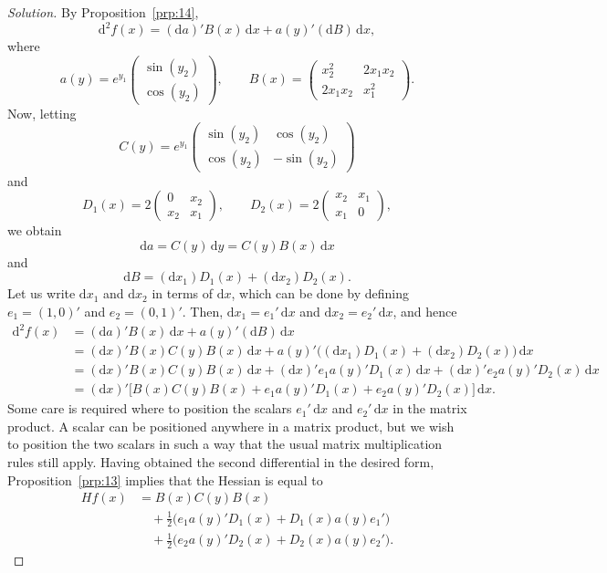 \documentclass[14pt]{extarticle}
\theoremstyle{plain}
\theoremstyle{definition}
\theoremstyle{remark}
\newenvironment{solution}{%
  \begin{proof}[Solution]%
}{%
  \end{proof}%
}
\newcommand{\dd}{\mathrm{d}}
\begin{document}
\begin{solution}
By Proposition~\ref{prp:14},
\[
\dd^2 f(x) = (\dd a)' B(x)\, \dd x + a(y)'(\dd B)\, \dd x,
\]
where
\[
a(y) = e^{y_1} \begin{pmatrix} \sin(y_2) \\ \cos(y_2) \end{pmatrix}, \qquad
B(x) = \begin{pmatrix} x_2^2 & 2x_1 x_2 \\ 2x_1 x_2 & x_1^2 \end{pmatrix}.
\]
Now, letting
\[
C(y) = e^{y_1} \begin{pmatrix} \sin(y_2) & \cos(y_2) \\ \cos(y_2) & -\sin(y_2) \end{pmatrix}
\]
and
\[
D_1(x) = 2\begin{pmatrix} 0 & x_2 \\ x_2 & x_1 \end{pmatrix}, \qquad
D_2(x) = 2\begin{pmatrix} x_2 & x_1 \\ x_1 & 0 \end{pmatrix},
\]
we obtain
\[
\dd a = C(y)\, \dd y = C(y) B(x)\, \dd x
\]
and
\[
\dd B = (\dd x_1) D_1(x) + (\dd x_2) D_2(x).
\]
Let us write $\dd x_1$ and $\dd x_2$ in terms of $\dd x$, which can be done by defining $e_1 = (1, 0)'$ and $e_2 = (0, 1)'$. Then, $\dd x_1 = e_1'\, \dd x$ and $\dd x_2 = e_2'\, \dd x$, and hence
\begin{align*}
\dd^2 f(x) &= (\dd a)' B(x)\, \dd x + a(y)'(\dd B)\, \dd x \\
&= (\dd x)' B(x) C(y) B(x)\, \dd x + a(y)'\bigl((\dd x_1) D_1(x) + (\dd x_2) D_2(x)\bigr)\, \dd x \\
&= (\dd x)' B(x) C(y) B(x)\, \dd x + (\dd x)' e_1 a(y)' D_1(x)\, \dd x + (\dd x)' e_2 a(y)' D_2(x)\, \dd x \\
&= (\dd x)'\bigl[B(x) C(y) B(x) + e_1 a(y)' D_1(x) + e_2 a(y)' D_2(x)\bigr]\, \dd x.
\end{align*}
Some care is required where to position the scalars $e_1'\, \dd x$ and $e_2'\, \dd x$ in the matrix product. A scalar can be positioned anywhere in a matrix product, but we wish to position the two scalars in such a way that the usual matrix multiplication rules still apply. Having obtained the second differential in the desired form, Proposition~\ref{prp:13} implies that the Hessian is equal to
\begin{align*}
Hf(x) &= B(x) C(y) B(x) \\
&\quad + \tfrac{1}{2}\bigl(e_1 a(y)' D_1(x) + D_1(x) a(y) e_1'\bigr) \\
&\quad + \tfrac{1}{2}\bigl(e_2 a(y)' D_2(x) + D_2(x) a(y) e_2'\bigr).
\end{align*}
\end{solution}
\end{document}
